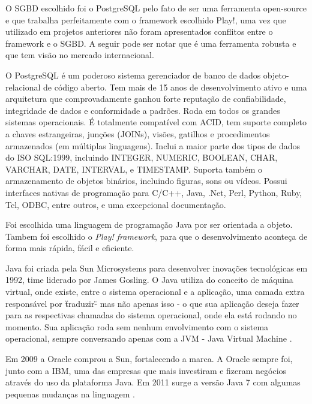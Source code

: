 
O SGBD escolhido foi o PostgreSQL pelo fato de ser uma ferramenta open-source e que trabalha perfeitamente com o framework escolhido Play!, uma vez que utilizado em projetos anteriores não foram apresentados conflitos entre o framework e o SGBD. A seguir pode ser notar que é uma ferramenta robusta e que tem visão no mercado internacional.\par

O PostgreSQL é um poderoso sistema gerenciador de banco de dados objeto-relacional de código aberto.  Tem mais de 15 anos de desenvolvimento ativo e uma arquitetura que comprovadamente ganhou forte reputação de confiabilidade, integridade de dados e conformidade a padrões.  Roda em todos os grandes sistemas operacionais. É totalmente compatível com ACID, tem suporte completo a chaves estrangeiras, junções (JOINs), visões, gatilhos e procedimentos armazenados (em múltiplas linguagens).  Inclui a maior parte dos tipos de dados do ISO SQL:1999, incluindo INTEGER, NUMERIC, BOOLEAN, CHAR, VARCHAR, DATE, INTERVAL, e TIMESTAMP.  Suporta também o armazenamento de objetos binários, incluindo figuras, sons ou vídeos.  Possui interfaces nativas de programação para C/C++, Java, .Net, Perl, Python, Ruby, Tcl, ODBC, entre outros, e uma excepcional documentação.\cite{postgresql}


Foi escolhida uma linguagem de programação Java por ser orientada a objeto. Tambem foi escolhido o \textit{Play! framework}, para que o desenvolvimento aconteça de forma mais rápida, fácil e eficiente.\par

Java foi criada pela Sun Microsystems para desenvolver inovações tecnológicas em 1992, time liderado por James Gosling. O Java utiliza do conceito de máquina virtual, onde existe, entre o sistema operacional e a aplicação, uma camada extra responsável por \"traduzir\" - mas não apenas isso - o que sua aplicação deseja fazer para as respectivas chamadas do sistema operacional, onde ela está rodando no momento. Sua aplicação roda sem nenhum envolvimento com o sistema operacional, sempre conversando apenas com a JVM - Java Virtual Machine \cite{caelum}.\par

Em 2009 a Oracle comprou a Sun, fortalecendo a marca. A Oracle sempre foi, junto com a IBM, uma das empresas que mais investiram e fizeram negócios através do uso da plataforma Java. Em 2011 surge a versão Java 7 com algumas pequenas mudanças na linguagem \cite{caelum}.\par

